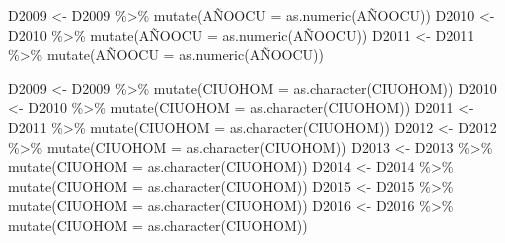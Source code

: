 \documentclass[
]{article}
\newenvironment{Shaded}{\begin{snugshade}}{\end{snugshade}}
\newcommand{\AttributeTok}[1]{\textcolor[rgb]{0.77,0.63,0.00}{#1}}
\newcommand{\FunctionTok}[1]{\textcolor[rgb]{0.00,0.00,0.00}{#1}}
\newcommand{\NormalTok}[1]{#1}
\newcommand{\OtherTok}[1]{\textcolor[rgb]{0.56,0.35,0.01}{#1}}
\newcommand{\SpecialCharTok}[1]{\textcolor[rgb]{0.00,0.00,0.00}{#1}}
\begin{document}
\begin{Shaded}
\begin{Highlighting}[]
\NormalTok{D2009 }\OtherTok{\textless{}{-}}\NormalTok{ D2009 }\SpecialCharTok{\%\textgreater{}\%} \FunctionTok{mutate}\NormalTok{(AÑOOCU }\OtherTok{=} \FunctionTok{as.numeric}\NormalTok{(AÑOOCU))}
\NormalTok{D2010 }\OtherTok{\textless{}{-}}\NormalTok{ D2010 }\SpecialCharTok{\%\textgreater{}\%} \FunctionTok{mutate}\NormalTok{(AÑOOCU }\OtherTok{=} \FunctionTok{as.numeric}\NormalTok{(AÑOOCU))}
\NormalTok{D2011 }\OtherTok{\textless{}{-}}\NormalTok{ D2011 }\SpecialCharTok{\%\textgreater{}\%} \FunctionTok{mutate}\NormalTok{(AÑOOCU }\OtherTok{=} \FunctionTok{as.numeric}\NormalTok{(AÑOOCU))}
\end{Highlighting}
\end{Shaded}

\begin{Shaded}
\begin{Highlighting}[]
\NormalTok{D2009 }\OtherTok{\textless{}{-}}\NormalTok{ D2009 }\SpecialCharTok{\%\textgreater{}\%} \FunctionTok{mutate}\NormalTok{(}\AttributeTok{CIUOHOM =} \FunctionTok{as.character}\NormalTok{(CIUOHOM))}
\NormalTok{D2010 }\OtherTok{\textless{}{-}}\NormalTok{ D2010 }\SpecialCharTok{\%\textgreater{}\%} \FunctionTok{mutate}\NormalTok{(}\AttributeTok{CIUOHOM =} \FunctionTok{as.character}\NormalTok{(CIUOHOM))}
\NormalTok{D2011 }\OtherTok{\textless{}{-}}\NormalTok{ D2011 }\SpecialCharTok{\%\textgreater{}\%} \FunctionTok{mutate}\NormalTok{(}\AttributeTok{CIUOHOM =} \FunctionTok{as.character}\NormalTok{(CIUOHOM))}
\NormalTok{D2012 }\OtherTok{\textless{}{-}}\NormalTok{ D2012 }\SpecialCharTok{\%\textgreater{}\%} \FunctionTok{mutate}\NormalTok{(}\AttributeTok{CIUOHOM =} \FunctionTok{as.character}\NormalTok{(CIUOHOM))}
\NormalTok{D2013 }\OtherTok{\textless{}{-}}\NormalTok{ D2013 }\SpecialCharTok{\%\textgreater{}\%} \FunctionTok{mutate}\NormalTok{(}\AttributeTok{CIUOHOM =} \FunctionTok{as.character}\NormalTok{(CIUOHOM))}
\NormalTok{D2014 }\OtherTok{\textless{}{-}}\NormalTok{ D2014 }\SpecialCharTok{\%\textgreater{}\%} \FunctionTok{mutate}\NormalTok{(}\AttributeTok{CIUOHOM =} \FunctionTok{as.character}\NormalTok{(CIUOHOM))}
\NormalTok{D2015 }\OtherTok{\textless{}{-}}\NormalTok{ D2015 }\SpecialCharTok{\%\textgreater{}\%} \FunctionTok{mutate}\NormalTok{(}\AttributeTok{CIUOHOM =} \FunctionTok{as.character}\NormalTok{(CIUOHOM))}
\NormalTok{D2016 }\OtherTok{\textless{}{-}}\NormalTok{ D2016 }\SpecialCharTok{\%\textgreater{}\%} \FunctionTok{mutate}\NormalTok{(}\AttributeTok{CIUOHOM =} \FunctionTok{as.character}\NormalTok{(CIUOHOM))}

\end{Highlighting}
\end{Shaded}
\end{document}
